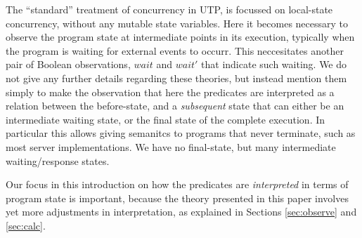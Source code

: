 The ``standard'' treatment of concurrency in UTP\cite[Chps. 7,8]{Hoare-He98},
is focussed on local-state concurrency, without any mutable state variables.
Here it becomes necessary to observe the program state at intermediate points
in its execution,
typically when the program is waiting
for external events to occurr.
This neccesitates another pair of Boolean observations, $wait$ and $wait'$
that indicate such waiting.
We do not give any further details regarding these theories,
but instead mention them simply to make the observation
that here the predicates are interpreted as a relation between
the before-state,
and a \emph{subsequent} state that can either be
an intermediate waiting state, or the final state of the complete execution.
In particular this allows giving semanitcs to programs that never terminate,
such as most server implementations.
We have no final-state, but many intermediate waiting/response states.

Our focus in this introduction on how the predicates are \emph{interpreted}
in terms of program state is important,
because the theory presented in this paper involves yet more
adjustments in interpretation,
as explained in Sections \ref{sec:observe} and \ref{sec:calc}.
